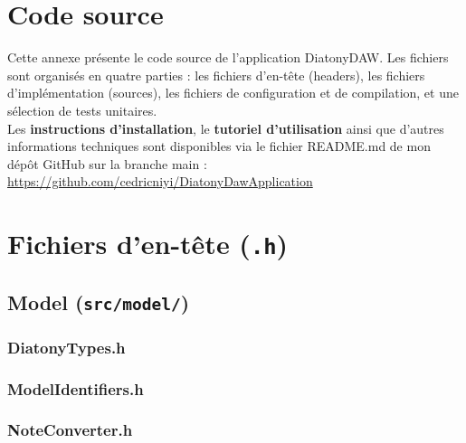 \chapter*{Code source}
Cette annexe présente le code source de l'application DiatonyDAW. Les fichiers sont organisés en quatre parties : les fichiers d'en-tête (headers), les fichiers d'implémentation (sources), les fichiers de configuration et de compilation, et une sélection de tests unitaires.\\

Les \textbf{instructions d'installation}, le \textbf{tutoriel d'utilisation} ainsi que d'autres informations techniques sont disponibles via le fichier README.md de mon dépôt GitHub sur la branche main : \url{https://github.com/cedricniyi/DiatonyDawApplication}

\chapter{Fichiers d'en-tête (\texttt{.h})}

\section{Model (\texttt{src/model/})}

\subsection{DiatonyTypes.h}


\subsection{ModelIdentifiers.h}


\subsection{NoteConverter.h}


